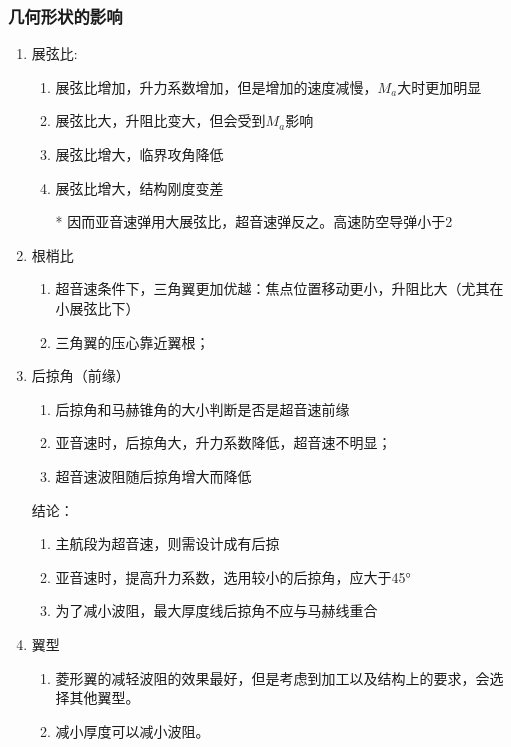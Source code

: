 \subsubsection{几何形状的影响}
\begin{enumerate}
    \item 展弦比:
    
    {\kaishu 
    \begin{enumerate}[i]
        \item 展弦比增加，升力系数增加，但是增加的速度减慢，$M_a$大时更加明显
        \item 展弦比大，升阻比变大，但会受到$M_a$影响
        \item 展弦比增大，临界攻角降低
        \item 展弦比增大，结构刚度变差
        \item [*] 因而亚音速弹用大展弦比，超音速弹反之。高速防空导弹小于2
    \end{enumerate}
    }
    \item 根梢比
    
    {\kaishu 
    \begin{enumerate}[i]
        \item 超音速条件下，三角翼更加优越：焦点位置移动更小，升阻比大（尤其在小展弦比下）
        \item 三角翼的压心靠近翼根；
    \end{enumerate}
    }
    \item 后掠角（前缘）
    
    {\kaishu 
    \begin{enumerate}[i]
        \item 后掠角和马赫锥角的大小判断是否是超音速前缘
        \item 亚音速时，后掠角大，升力系数降低，超音速不明显；
        \item 超音速波阻随后掠角增大而降低
    \end{enumerate}

    结论：
    \begin{enumerate}[i]
        \item 主航段为超音速，则需设计成有后掠
        \item 亚音速时，提高升力系数，选用较小的后掠角，应大于45°
        \item 为了减小波阻，最大厚度线后掠角不应与马赫线重合
    \end{enumerate}
    }
    \item 翼型
    
    \begin{enumerate}[i]
        \item 菱形翼的减轻波阻的效果最好，但是考虑到加工以及结构上的要求，会选择其他翼型。
        \item 减小厚度可以减小波阻。
    \end{enumerate}
\end{enumerate}
